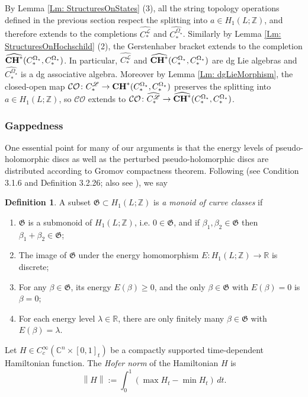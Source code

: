 \documentclass[10pt]{amsart}
\numberwithin{equation}{section}
\theoremstyle{plain}
\theoremstyle{definition}
\newtheorem{definition}[theorem]{Definition}
\theoremstyle{remark}
\numberwithin{equation}{section}
\newcommand{\R}{\mathbb{R}}
\newcommand{\Z}{\mathbb{Z}}
\newcommand{\C}{\mathbb{C}}
\newcommand{\wh}[1]{\widehat{#1}}
\newcommand{\CO}{\mathcal{CO}}
\newcommand{\CC}{\textbf{\textup{CH}}}
\newcommand{\norm}[1]{\left\lVert{#1}\right\rVert}
\newcommand{\CFr}{C_*^\mathscr{L}}
\newcommand{\CBa}{C_*^{\Omega_\star}}
\begin{document}
{By Lemma \ref{Lm: StructuresOnStates} (3), all the string topology operations defined in the previous section respect the splitting into $a\in H_1(L;\Z)$, and therefore extends to the completions $\wh{\CFr}$ and $\wh{\CBa}$.
Similarly by Lemma \ref{Lm: StructuresOnHochschild} (2), the Gerstenhaber bracket extends to the completion $\wh{\CC^*}(\CBa,\CBa)$.
In particular, $\wh{\CFr}$ and $\wh{\CC^*} (\CBa,\CBa)$ are dg Lie algebras and $\wh{\CBa}$ is a dg associative algebra.
Moreover by Lemma \ref{Lm: dgLieMorphism}, the closed-open map $\CO\colon \CFr\to \CC^*(\CBa,\CBa)$ preserves the splitting into $a\in H_1(L;\Z)$, so $\CO$ extends to $\CO\colon \wh{\CFr}\to \wh{\CC^*}(\CBa,\CBa)$.


\subsubsection{Gappedness}
One essential point for many of our arguments is that the energy levels of pseudo-holomorphic discs as well as the perturbed pseudo-holomorphic discs are distributed according to Gromov compactness theorem. Following \cite{FOOO1} (see Condition 3.1.6 and Definition 3.2.26; also see \cite{Irie2,YuanHangThesis}), we say
\begin{definition}\label{Defn: monoid}
A subset $\mathfrak{G}\subset H_1(L;\Z)$ is \emph{a monoid of curve classes} if 
\begin{enumerate}
	\item $\mathfrak{G}$ is a submonoid of $H_1(L;\Z)$, i.e. $0\in\mathfrak{G}$, and if $\beta_1,\beta_2\in \mathfrak{G}$ then $\beta_1+\beta_2\in \mathfrak{G}$;
	\item The image of $\mathfrak{G}$ under the energy homomorphism $E\colon H_1(L;\Z)\to \R$ is discrete;
	\item For any $\beta\in \mathfrak{G}$, its energy $E(\beta)\geq 0$, and the only $\beta\in \mathfrak{G}$ with $E(\beta)=0$ is $\beta=0$;
	\item For each energy level $\lambda\in \R$, there are only finitely many $\beta\in \mathfrak{G}$ with $E(\beta)=\lambda$.
\end{enumerate}
\end{definition}

Let $H\in C_c^\infty(\C^n\times [0,1]_t)$ be a compactly supported time-dependent Hamiltonian function. 
The \emph{Hofer norm} of the Hamiltonian $H$ is
\begin{equation}\label{Eq: HoferNorm}
	\norm{H} := \int_0^1 \left(\max H_t - \min H_t\right)\,dt.
\end{equation}

}
\end{document}
